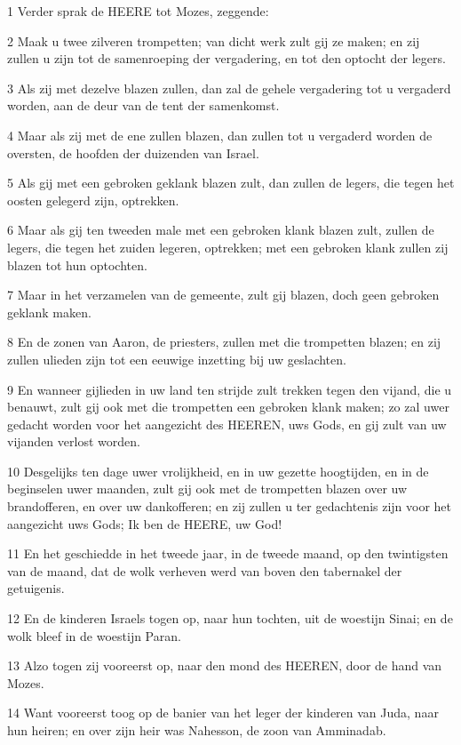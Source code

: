 \par 1 Verder sprak de HEERE tot Mozes, zeggende:
\par 2 Maak u twee zilveren trompetten; van dicht werk zult gij ze maken; en zij zullen u zijn tot de samenroeping der vergadering, en tot den optocht der legers.
\par 3 Als zij met dezelve blazen zullen, dan zal de gehele vergadering tot u vergaderd worden, aan de deur van de tent der samenkomst.
\par 4 Maar als zij met de ene zullen blazen, dan zullen tot u vergaderd worden de oversten, de hoofden der duizenden van Israel.
\par 5 Als gij met een gebroken geklank blazen zult, dan zullen de legers, die tegen het oosten gelegerd zijn, optrekken.
\par 6 Maar als gij ten tweeden male met een gebroken klank blazen zult, zullen de legers, die tegen het zuiden legeren, optrekken; met een gebroken klank zullen zij blazen tot hun optochten.
\par 7 Maar in het verzamelen van de gemeente, zult gij blazen, doch geen gebroken geklank maken.
\par 8 En de zonen van Aaron, de priesters, zullen met die trompetten blazen; en zij zullen ulieden zijn tot een eeuwige inzetting bij uw geslachten.
\par 9 En wanneer gijlieden in uw land ten strijde zult trekken tegen den vijand, die u benauwt, zult gij ook met die trompetten een gebroken klank maken; zo zal uwer gedacht worden voor het aangezicht des HEEREN, uws Gods, en gij zult van uw vijanden verlost worden.
\par 10 Desgelijks ten dage uwer vrolijkheid, en in uw gezette hoogtijden, en in de beginselen uwer maanden, zult gij ook met de trompetten blazen over uw brandofferen, en over uw dankofferen; en zij zullen u ter gedachtenis zijn voor het aangezicht uws Gods; Ik ben de HEERE, uw God!
\par 11 En het geschiedde in het tweede jaar, in de tweede maand, op den twintigsten van de maand, dat de wolk verheven werd van boven den tabernakel der getuigenis.
\par 12 En de kinderen Israels togen op, naar hun tochten, uit de woestijn Sinai; en de wolk bleef in de woestijn Paran.
\par 13 Alzo togen zij vooreerst op, naar den mond des HEEREN, door de hand van Mozes.
\par 14 Want vooreerst toog op de banier van het leger der kinderen van Juda, naar hun heiren; en over zijn heir was Nahesson, de zoon van Amminadab.
